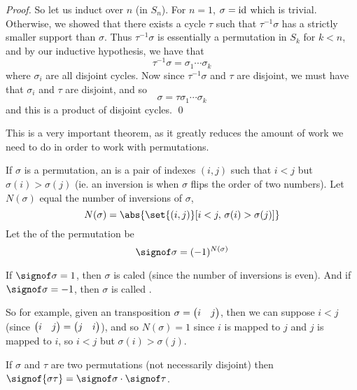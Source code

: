 \begin{proof}
    So let us induct over $n$ (in $S_n$).
    For $n=1$, $\sigma=\mathrm{id}$ which is trivial.
    Otherwise, we showed that there exists a cycle $\tau$ such that $\tau^{-1}\sigma$ has a strictly smaller support than $\sigma$.
    Thus $\tau^{-1}\sigma$ is essentially a permutation in $S_k$ for $k<n$, and by our inductive hypothesis, we have that
    \[ \tau^{-1}\sigma = \sigma_1\cdots\sigma_k \]
    where $\sigma_i$ are all disjoint cycles.
    Now since $\tau^{-1}\sigma$ and $\tau$ are disjoint, we must have that $\sigma_i$ and $\tau$ are disjoint, and so
    \[ \sigma = \tau\sigma_1\cdots\sigma_k \]
    and this is a product of disjoint cycles.
    \qed

\end{proof}

This is a very important theorem, as it greatly reduces the amount of work we need to do in order to work with permutations.

\begin{defn*}

    If $\sigma$ is a permutation, an  is a pair of indexes $(i,j)$ such that $i<j$ but $\sigma(i)>\sigma(j)$ (ie. an inversion is when $\sigma$ flips the order of two numbers).
    Let $N(\sigma)$ equal the number of inversions of $\sigma$,
    \[ N(\sigma) = \abs{\set{(i,j)}[i<j,\,\sigma(i)>\sigma(j)]} \]
    Let the  of the permutation be
    \[ \signof\sigma = (-1)^{N(\sigma)} \]

    If $\signof\sigma=1$, then $\sigma$ is caled  (since the number of inversions is even).
    And if $\signof\sigma=-1$, then $\sigma$ is called .

\end{defn*}

So for example, given an transposition $\sigma=\begin{pmatrix}i&j\end{pmatrix}$, then we can suppose $i<j$ (since $\begin{pmatrix}i&j\end{pmatrix}=\begin{pmatrix}j&i\end{pmatrix}$), and so $N(\sigma)=1$ since $i$ is mapped to $j$ and $j$ is mapped to $i$, so
$i<j$ but $\sigma(i)>\sigma(j)$.

\begin{prop*}

    If $\sigma$ and $\tau$ are two permutations (not necessarily disjoint) then $\signof{\sigma\tau}=\signof\sigma\cdot\signof\tau$.

\end{prop*}

